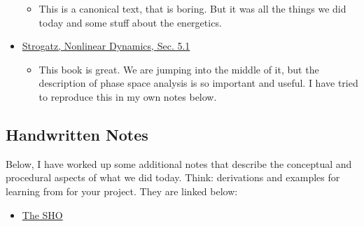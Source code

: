\begin{itemize}
  \begin{itemize}
  \tightlist
  \item
    This is a canonical text, that is boring. But it was all the things
    we did today and some stuff about the energetics.
  \end{itemize}
\item
  \href{https://github.com/dannycab/phy415msu/blob/main/MMIPbook/assets/pdfs/scans/Strogatz_Nonlinear_Ch5.1.pdf}{Strogatz,
  Nonlinear Dynamics, Sec. 5.1}

  \begin{itemize}
  \tightlist
  \item
    This book is great. We are jumping into the middle of it, but the
    description of phase space analysis is so important and useful. I
    have tried to reproduce this in my own notes below.
  \end{itemize}
\end{itemize}

\subsection{Handwritten Notes}\label{handwritten-notes}

Below, I have worked up some additional notes that describe the
conceptual and procedural aspects of what we did today. Think:
derivations and examples for learning from for your project. They are
linked below:

\begin{itemize}
\tightlist
\item
  \href{../../assets/notes/Notes-SHO.pdf}{The SHO}
\end{itemize}
